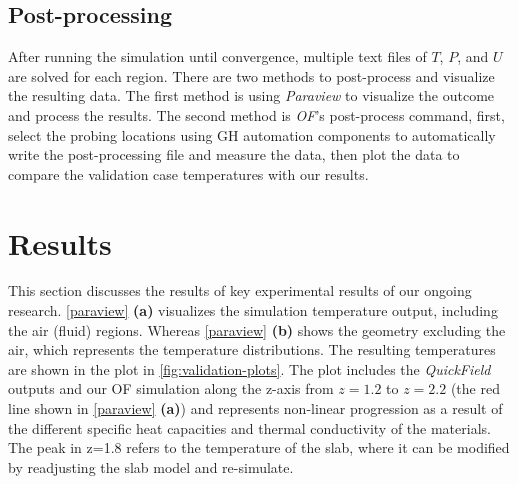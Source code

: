 \subsection{Post-processing}
After running the simulation until convergence, multiple text files of $T$, $P$, and $U$ are solved for each region. There are two methods to post-process and visualize the resulting data. The first method is using \textit{Paraview} to visualize the outcome and process the results. The second method is \textit{\gls{OF}}'s post-process command, first, select the probing locations using  \gls{GH} automation components to automatically write the post-processing file and measure the data, then plot the data to compare the validation case temperatures with our results. 




\section{Results}
This section discusses the results of key experimental results of our ongoing research. 
\cref{paraview} \textbf{(a)} visualizes the simulation temperature output, including the air (fluid) regions. Whereas
\cref{paraview} \textbf{(b)} shows the geometry excluding the air, which represents the temperature distributions. The resulting temperatures are shown in the plot in \cref{fig:validation-plots}. The plot includes the \textit{QuickField} outputs and our  \gls{OF} simulation along the z-axis from $z= 1.2$ to $z=2.2$ (the red line shown in \cref{paraview} \textbf{(a)}) and represents non-linear progression as a result of the different specific heat capacities and thermal conductivity of the materials. The peak in z=1.8 refers to the temperature of the slab, where it can be modified by readjusting the slab model and re-simulate. 



